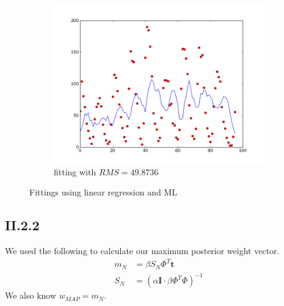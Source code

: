 \documentclass{article}
\begin{document}
\begin{figure}[!ht]
\begin{subfigure}[b]{0.5\textwidth}
        \includegraphics[width=\textwidth]{Part2/II213.png}
        \caption{fitting with $RMS = 49.8736$}
    \end{subfigure}
    \caption{Fittings using linear regression and ML}
    \label{fig:II21}
\end{figure}


\subsection{II.2.2}

We used the following to calculate our maximum posterior weight vector.\\
\begin{align*}
    m_{N} &= \beta S_{N} \Phi^{T} \textbf{t}\\
    S_{N} &= (\alpha \textbf{I} \cdot \beta \Phi^{T} \Phi)^{-1}
\end{align*}
We also know $w_{MAP} = m_N$.\\
\end{document}
